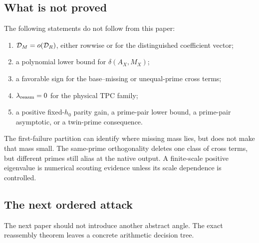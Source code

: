 \subsection{What is not proved}

The following statements do not follow from this paper:
\begin{enumerate}[leftmargin=2.3em]
 \item \(\mathcal D_M=o(\mathcal D_R)\), either rowwise or for the distinguished
       coefficient vector;
 \item a polynomial lower bound for \(\delta(A_X,M_X)\);
 \item a favorable sign for the base--missing or unequal-prime cross terms;
 \item \(\lambda_{\rm reasm}=0\) for the physical TPC family;
 \item a positive fixed-\(h_0\) parity gain, a prime-pair lower bound, a
       prime-pair asymptotic, or a twin-prime consequence.
\end{enumerate}
The first-failure partition can identify where missing mass lies, but does
not make that mass small.  The same-prime orthogonality deletes one class
of cross terms, but different primes still alias at the native output.  A
finite-scale positive eigenvalue is numerical scouting evidence unless its
scale dependence is controlled.

\subsection{The next ordered attack}

The next paper should not introduce another abstract angle.  The exact
reassembly theorem leaves a concrete arithmetic decision tree.

